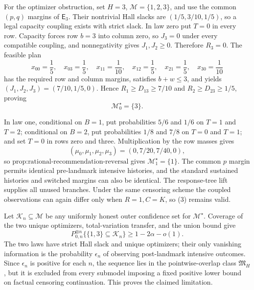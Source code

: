 For the optimizer obstruction, set \(H=3\), \(\mathcal M=\{1,2,3\}\), and use the common \((p,q)\) margins of \(\mathsf E_3\).  Their nontrivial Hall slacks are \((1/5,3/10,1/5)\), so a legal capacity coupling exists with strict slack.  In law zero put \(T=0\) in every row.  Capacity forces row \(b=3\) into column zero, so \(J_3=0\) under every compatible coupling, and nonnegativity gives \(J_1,J_2\ge0\).  Therefore \(R_3=0\).  The feasible plan
\[
 x_{00}=\frac15,\quad x_{03}=\frac15,\quad
 x_{11}=\frac1{10},\quad x_{12}=\frac15,\quad
 x_{21}=\frac15,\quad x_{30}=\frac1{10}                  \tag{6}
\]
has the required row and column margins, satisfies \(b+w\le3\), and yields
\((J_1,J_2,J_3)=(7/10,1/5,0)\).  Hence
\(R_1\ge D_{13}\ge7/10\) and \(R_2\ge D_{23}\ge1/5\), proving
\[
 \mathcal M^\star_0=\{3\}.                               \tag{7}
\]

In law one, conditional on \(B=1\), put probabilities \(5/6\) and \(1/6\) on \(T=1\) and \(T=2\); conditional on \(B=2\), put probabilities \(1/8\) and \(7/8\) on \(T=0\) and \(T=1\); and set \(T=0\) in rows zero and three.  Multiplication by the row masses gives
\[
 (\mu_0,\mu_1,\mu_2,\mu_3)=(0,7/20,7/40,0),              \tag{8}
\]
so \(\text{prop:rational-recommendation-reversal}\) gives
\(\mathcal M^\star_1=\{1\}\).  The common \(p\) margin permits identical pre-landmark intensive histories, and the standard sustained histories and switched margins can also be identical.  The response-tree lift supplies all unused branches.  Under the same censoring scheme the coupled observations can again differ only when \(R=1,C=K\), so (3) remains valid.

Let \(\mathcal K_n\subseteq\mathcal M\) be any uniformly honest outer confidence set for \(\mathcal M^\star\).  Coverage of the two unique optimizers, total-variation transfer, and the union bound give
\[
 P_{0,n}^{\otimes n}\{\{1,3\}\subseteq\mathcal K_n\}
 \ge1-2\alpha-o(1).                                      \tag{9}
\]
The two laws have strict Hall slack and unique optimizers; their only vanishing information is the probability \(\epsilon_n\) of observing post-landmark intensive outcomes.  Since \(\epsilon_n\) is positive for each \(n\), the sequence lies in the pointwise-overlap class \(\mathfrak M_H\), but it is excluded from every submodel imposing a fixed positive lower bound on factual censoring continuation.  This proves the claimed limitation.
